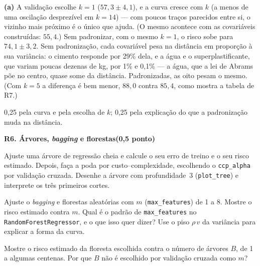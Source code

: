 \documentclass[11pt,a4paper]{article}
\newcommand{\tarefa}[3]{%
  \bigskip\par\noindent
  {\large\bfseries\color{azulufrj}#1. #2}\hfill{\bfseries(#3)}\par
  \nopagebreak\vspace{0.3em}}
\newcommand{\cod}[1]{\texttt{#1}}
\begin{document}
\begin{solucao}
\textbf{(a)} A validação escolhe $k=1$ ($57{,}3\pm4{,}1$), e a curva cresce com $k$
(a menos de uma oscilação desprezível em $k=14$) --- com poucos traços parecidos entre
si, o vizinho mais próximo é o único que ajuda. (O mesmo acontece com as covariáveis
construídas: $55{,}4$.) Sem padronizar, com o mesmo $k=1$, o risco sobe para
$74{,}1\pm3{,}2$. Sem padronização, cada covariável pesa na distância em proporção à
sua variância: o cimento responde por 29\% dela, e a água e o superplastificante, que
variam poucas dezenas de kg, por 1\% e 0,1\% --- a água, que a lei de Abrams põe no
centro, quase some da distância. Padronizadas, as oito pesam o mesmo. (Com $k=5$ a
diferença é bem menor, $88{,}0$ contra $85{,}4$, como mostra a tabela de R7.)
\end{solucao}

\begin{criterio}
0,25 pela curva e pela escolha de $k$; 0,25 pela explicação do que a padronização
muda na distância.
\end{criterio}

\tarefa{R6}{Árvores, \emph{bagging} e florestas}{0,5 ponto}

\begin{itens}
  \item Ajuste uma árvore de regressão cheia e calcule o seu erro de treino e o seu
        risco estimado. Depois, faça a poda por custo--complexidade, escolhendo o
        \cod{ccp\_alpha} por validação cruzada. Desenhe a árvore com profundidade~3
        (\cod{plot\_tree}) e interprete os três primeiros cortes.
  \item Ajuste o \emph{bagging} e florestas aleatórias com $m$ (\cod{max\_features})
        de 1 a 8. Mostre o risco estimado contra $m$. Qual é o padrão de
        \cod{max\_features} no \cod{RandomForestRegressor}, e o que isso quer dizer?
        Use o piso $\rho\,v$ da variância para explicar a forma da curva.
  \item Mostre o risco estimado da floresta escolhida contra o número de árvores
        $B$, de 1 a algumas centenas. Por que $B$ não é escolhido por validação
        cruzada como $m$?
\end{itens}
\end{document}
